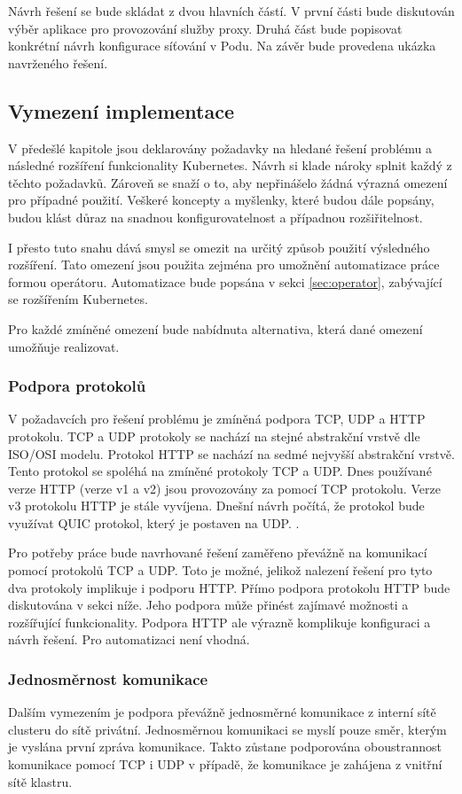 Návrh řešení se bude skládat z dvou hlavních částí. V první části bude diskutován výběr aplikace pro provozování služby proxy. Druhá část bude popisovat konkrétní návrh konfigurace síťování v Podu. Na závěr bude provedena ukázka navrženého řešení.

\subsection{Vymezení implementace}
V předešlé kapitole jsou deklarovány požadavky na hledané řešení problému a následné rozšíření funkcionality Kubernetes. Návrh si klade nároky splnit každý z těchto požadavků. Zároveň se snaží o to, aby nepřinášelo žádná výrazná omezení pro případné použití. Veškeré koncepty a myšlenky, které budou dále popsány, budou klást důraz na snadnou konfigurovatelnost a případnou rozšiřitelnost.

I přesto tuto snahu dává smysl se omezit na určitý způsob použití výsledného rozšíření. Tato omezení jsou použita zejména pro umožnění automatizace práce formou operátoru. Automatizace bude popsána v sekci \ref{sec:operator}, zabývající se rozšířením Kubernetes.

Pro každé zmíněné omezení bude nabídnuta alternativa, která dané omezení umožňuje realizovat. 

\subsubsection*{Podpora protokolů}
V požadavcích pro řešení problému je zmíněná podpora TCP, UDP a HTTP protokolu. TCP a UDP protokoly se nachází na stejné abstrakční vrstvě dle ISO/OSI modelu. Protokol HTTP se nachází na sedmé nejvyšší abstrakční vrstvě. Tento protokol se spoléhá na zmíněné protokoly TCP a UDP. Dnes používané verze HTTP (verze v1 a v2) jsou provozovány za pomocí TCP protokolu. Verze v3 protokolu HTTP je stále vyvíjena. Dnešní návrh počítá, že protokol bude využívat QUIC protokol, který je postaven na UDP. \cite{fesl_2021_aplikan}.

Pro potřeby práce bude navrhované řešení zaměřeno převážně na komunikací pomocí protokolů TCP a UDP. Toto je možné, jelikož nalezení řešení pro tyto dva protokoly implikuje i podporu HTTP. Přímo podpora protokolu HTTP bude diskutována v sekci níže. Jeho podpora může přinést zajímavé možnosti a rozšířující funkcionality. Podpora HTTP ale výrazně komplikuje konfiguraci a návrh řešení. Pro automatizaci není vhodná.

\subsubsection*{Jednosměrnost komunikace}\label{vymezeni:1smer}
Dalším vymezením je podpora převážně jednosměrné komunikace z interní sítě clusteru do sítě privátní. Jednosměrnou komunikaci se myslí pouze směr, kterým je vyslána první zpráva komunikace. Takto zůstane podporována oboustrannost komunikace pomocí TCP i UDP v případě, že komunikace je zahájena z vnitřní sítě klastru.

